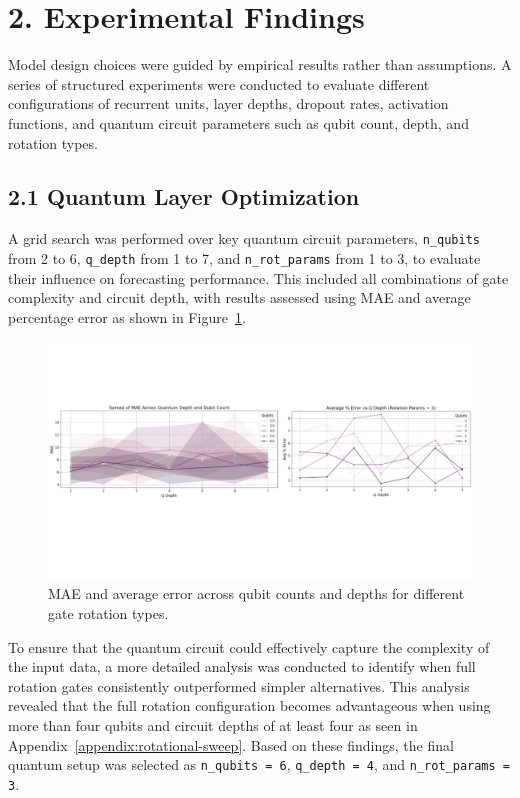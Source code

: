 \documentclass[10pt]{article}
\begin{document}
\section*{2. Experimental Findings}

Model design choices were guided by empirical results rather than assumptions. A series of structured experiments were conducted to evaluate different configurations of recurrent units, layer depths, dropout rates, activation functions, and quantum circuit parameters such as qubit count, depth, and rotation types.

\subsection*{2.1 Quantum Layer Optimization}

A grid search was performed over key quantum circuit parameters, \texttt{n\_qubits} from 2 to 6, \texttt{q\_depth} from 1 to 7, and \texttt{n\_rot\_params} from 1 to 3, to evaluate their influence on forecasting performance. This included all combinations of gate complexity and circuit depth, with results assessed using MAE and average percentage error as shown in Figure~\ref{fig:quantum analysis}.

\begin{figure}[H]
    \centering
    \includegraphics[trim=0cm 8cm 0cm 6.5cm,clip,width=0.8\paperwidth]{images/quantum analysis.png}
    \caption{MAE and average error across qubit counts and depths for different gate rotation types.}
    \label{fig:quantum analysis}
\end{figure}

To ensure that the quantum circuit could effectively capture the complexity of the input data, a more detailed analysis was conducted to identify when full rotation gates consistently outperformed simpler alternatives. This analysis revealed that the full rotation configuration becomes advantageous when using more than four qubits and circuit depths of at least four as seen in Appendix~\ref{appendix:rotational-sweep}. Based on these findings, the final quantum setup was selected as \texttt{n\_qubits = 6}, \texttt{q\_depth = 4}, and \texttt{n\_rot\_params = 3}.
\end{document}
